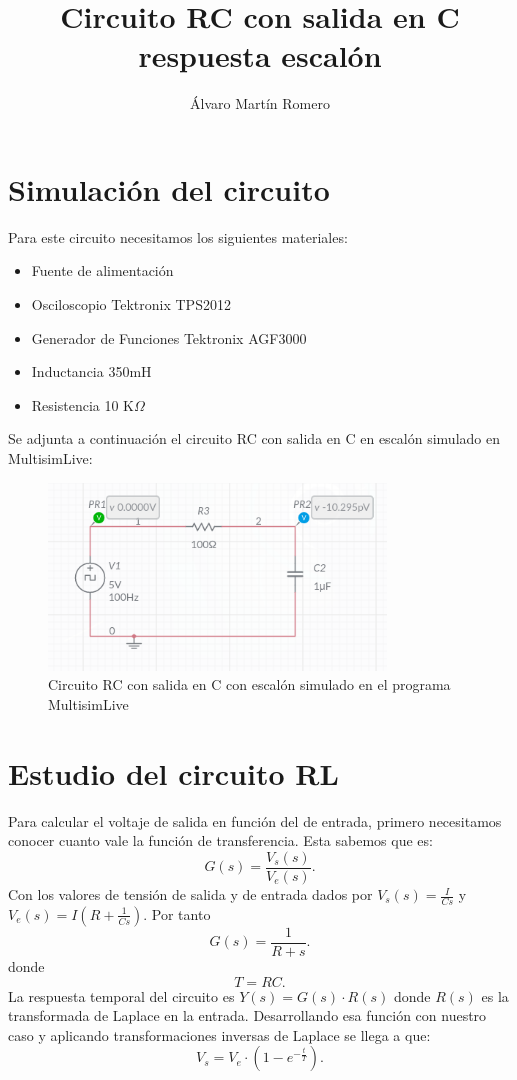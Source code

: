 \documentclass[11pt,letterpaper]{article}
\title{Circuito RC con salida en C respuesta escalón}
\author{Álvaro Martín Romero}
\begin{document}
\maketitle	
\section{Simulación del circuito}%
\label{sec:Simulación del circuito}
Para este circuito necesitamos los siguientes materiales:
\begin{itemize}
	\item Fuente de alimentación
	\item Osciloscopio Tektronix TPS2012
	\item Generador de Funciones Tektronix AGF3000
	\item Inductancia 350mH
	\item Resistencia 10 K$\Omega$
\end{itemize}
Se adjunta a continuación el circuito RC con salida en C en escalón simulado en MultisimLive:
\begin{figure}[H]
	\centering
	\includegraphics[width=0.8\textwidth]{imagen/circuitoRL_Rescalon.png}
	\caption{Circuito RC con salida en C con escalón simulado en el programa MultisimLive}
	\label{fig:imagen-circuitoRL}
\end{figure}
\section{Estudio del circuito RL}%
\label{sec:Estudio del circuito RL}
Para calcular el voltaje de salida en función del de entrada, primero necesitamos conocer cuanto vale la función de transferencia. Esta sabemos que es:
\[
	G\left( s \right) =\frac{V_s(s)}{V_e(s)}
.\] 
Con los valores de tensión de salida y de entrada dados por $V_s\left( s \right) =\frac{I}{Cs}$ y $V_e\left( s \right) =I\left( R+\frac{1}{Cs} \right) $. Por tanto
\[
	G\left( s \right) =\frac{1}{R+s}
.\] 
donde \[
	T=RC
.\] 
La respuesta temporal del circuito es $Y(s)=G(s)\cdot R(s)$ donde $R(s)$ es la transformada de Laplace en la entrada. Desarrollando esa función con nuestro caso y aplicando transformaciones inversas de Laplace se llega a que:
\[
	V_{s}=V_e\cdot \left(1-e^{-\frac{t}{T}} \right) 
.\] 
\end{document}
